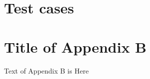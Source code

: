 \documentclass{article}
\begin{document}
\section{\\Test cases}\label{test.cases}

\section{Title of Appendix B}

Text of Appendix B is Here
\end{document}
